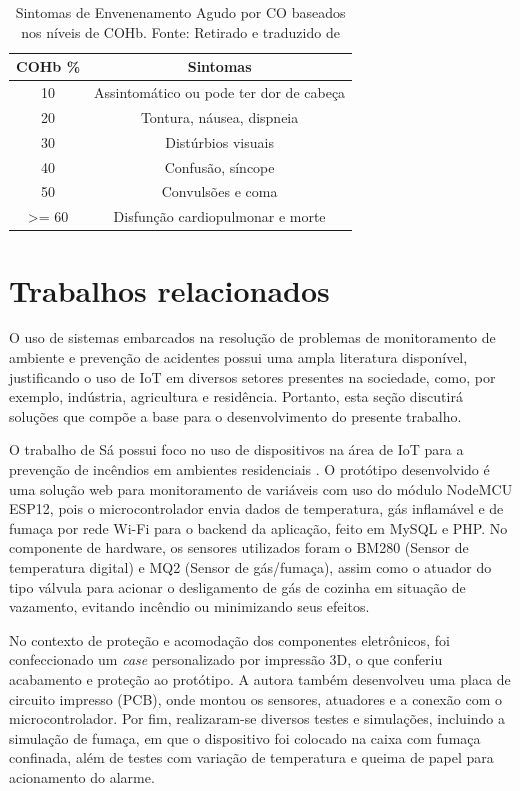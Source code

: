 \begin{table}[h!]
    \centering
    \caption{Sintomas de Envenenamento Agudo por CO baseados nos níveis de COHb. Fonte: Retirado e traduzido de \cite{carbon-monoxide-poisoning-varon}}
    \begin{tabular}{|c|c|}
        \hline
        \textbf{COHb \%} & \textbf{Sintomas} \\
        \hline
        10 & Assintomático ou pode ter dor de cabeça \\
        \hline
        20 & Tontura, náusea, dispneia \\
        \hline
        30 & Distúrbios visuais \\
        \hline
        40 & Confusão, síncope \\
        \hline
        50 & Convulsões e coma \\
        \hline
        >= 60 & Disfunção cardiopulmonar e morte \\
        \hline
    \end{tabular}
\end{table}



\section{Trabalhos relacionados}

O uso de sistemas embarcados na resolução de problemas de monitoramento de ambiente e prevenção 
de acidentes possui uma ampla literatura disponível, justificando o uso de IoT em diversos setores 
presentes na sociedade, como, por exemplo, indústria, agricultura e residência. Portanto, esta seção 
discutirá soluções que compõe a base para o desenvolvimento do presente trabalho.

O trabalho de Sá possui foco no uso de dispositivos na área de IoT para a prevenção de incêndios em ambientes residenciais \cite{uea-iot-deteccao-incendio}. 
O protótipo desenvolvido é uma solução web para monitoramento de variáveis com uso do módulo NodeMCU ESP12, pois o microcontrolador envia dados de temperatura, gás inflamável e de 
fumaça por rede Wi-Fi para o backend da aplicação, feito em MySQL e PHP. No componente de hardware, os sensores utilizados foram o BM280 (Sensor de temperatura digital) e
MQ2 (Sensor de gás/fumaça), assim como o atuador do tipo válvula para acionar o desligamento de gás de cozinha em situação de vazamento, evitando incêndio ou minimizando seus efeitos.

No contexto de proteção e acomodação dos componentes eletrônicos, foi confeccionado um \textit{case} personalizado por impressão 3D, o que conferiu acabamento 
e proteção ao protótipo. A autora também desenvolveu uma placa de circuito impresso (PCB), onde montou os sensores, atuadores e a conexão com o microcontrolador. Por fim, realizaram-se 
diversos testes e simulações, incluindo a simulação de fumaça, em que o dispositivo foi colocado na caixa com fumaça confinada, além de testes com variação de temperatura e queima de papel para acionamento do alarme. 

